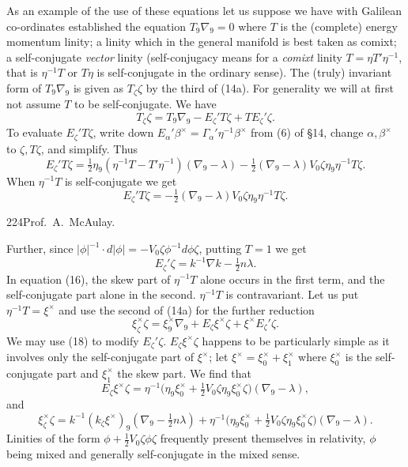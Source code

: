 \documentclass[11pt]{article}
\begin{document}
\indent As an example of the use of these equations let us suppose we have with Galilean co-ordinates established the equation $T_9\nabla_9=0$ where $T$ is the (complete) energy momentum linity; a linity which in the general manifold is best taken as comixt; a self-conjugate \emph{vector} linity (self-conjugacy means for a \emph{comixt} linity $T=\eta T'\eta^{-1}$, that is $\eta^{-1}T$ or $T\eta$ is self-conjugate in the ordinary sense). The (truly) invariant form of $T_9\nabla_9$ is given as $T_\zeta\zeta$ by the third of (14a). For generality we will at first not assume $T$ to be self-conjugate. We have
\[
T_\zeta\zeta=T_9\nabla_9-E_\zeta'T\zeta+TE_\zeta'\zeta.
\]
To evaluate $E_\zeta'T\zeta$, write down $E_\alpha'\beta^\times=\Gamma_\alpha'\eta^{-1}\beta^\times$ from (6) of §14, change $\alpha,\beta^\times$ to $\zeta,T\zeta$, and simplify. Thus
\begin{equation}E_\zeta'T\zeta=\tfrac12\eta_9(\eta^{-1}T-T'\eta^{-1})(\nabla_9-\lambda)-\tfrac12(\nabla_9-\lambda)V_0\zeta\eta_9\eta^{-1}T\zeta.\tag{16}\end{equation}
When $\eta^{-1}T$ is self-conjugate we get
\begin{equation}E_\zeta'T\zeta=-\tfrac12(\nabla_9-\lambda)V_0\zeta\eta_9\eta^{-1}T\zeta.\tag{17}\end{equation}
\newpage\thispagestyle{empty}\begin{center}224\hfill Prof.\ A.\ McAulay.\end{center}
Further, since $|\phi|^{-1}\cdot d|\phi|=-V_0\zeta\phi^{-1}d\phi\zeta$, putting $T=1$ we get
\begin{equation}E_\zeta'\zeta=k^{-1}\nabla k-\tfrac12n\lambda.\tag{18}\end{equation}
In equation (16), the skew part of $\eta^{-1}T$ alone occurs in the first term, and the self-conjugate part alone in the second. $\eta^{-1}T$ is contravariant. Let us put $\eta^{-1}T=\xi^\times$ and use the second of (14a) for the further reduction
\[
\xi_\zeta^\times\zeta=\xi_9^\times\nabla_9+E_\zeta\xi^\times\zeta+\xi^\times E_\zeta'\zeta.
\]
We may use (18) to modify $E_\zeta'\zeta$. $E_\zeta\xi^\times\zeta$ happens to be particularly simple as it involves only the self-conjugate part of $\xi^\times$; let $\xi^\times=\xi_0^\times+\xi_1^\times$ where $\xi_0^\times$ is the self-conjugate part and $\xi_1^\times$ the skew part. We find that
\begin{equation}E_\zeta\xi^\times\zeta=\eta^{-1}\bigl(\eta_9\xi_0^\times+\tfrac12V_0\zeta\eta_9\xi_0^\times\zeta\bigr)(\nabla_9-\lambda),\tag{17a}\end{equation}
and
\begin{equation}\xi_\zeta^\times\zeta=k^{-1}(k_\zeta\xi^\times)_9(\nabla_9-\tfrac12n\lambda)+\eta^{-1}\bigl(\eta_9\xi_0^\times+\tfrac12V_0\zeta\eta_9\xi_0^\times\zeta\bigr)(\nabla_9-\lambda).\tag{17b}\end{equation}
Linities of the form $\phi+\tfrac12V_0\zeta\phi\zeta$ frequently present themselves in relativity, $\phi$ being mixed and generally self-conjugate in the mixed sense.
\end{document}
